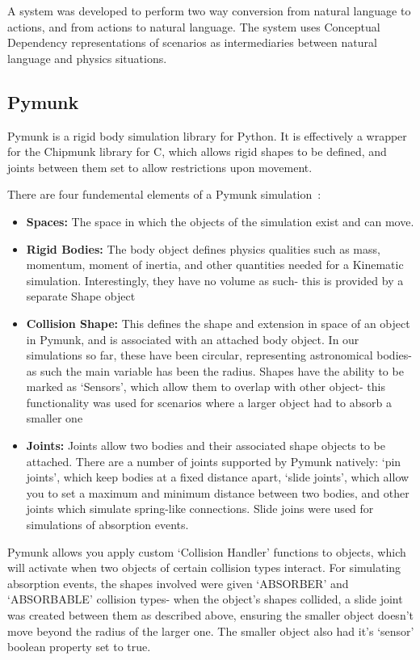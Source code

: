 \documentclass[dissertation.tex]{subfiles}
\begin{document}
    A system was developed to perform two way conversion from natural language to actions, and from actions to natural language. The system uses Conceptual Dependency representations of scenarios as intermediaries between natural language and physics situations.

    \subsection{Pymunk}
    Pymunk is a rigid body simulation library for Python. It is effectively a wrapper for the Chipmunk library for C, which allows rigid shapes to be defined, and joints between them set to allow restrictions upon movement.

    There are four fundemental elements of a Pymunk simulation~\cite{pymunk}:
    \begin{itemize}
        \item \textbf{Spaces:} The space in which the objects of the simulation exist and can move.
        \item \textbf{Rigid Bodies:} The body object defines physics qualities such as mass, momentum, moment of inertia, and other quantities needed for a Kinematic simulation. Interestingly, they have no volume as such- this is provided by a separate Shape object
        \item \textbf{Collision Shape:} This defines the shape and extension in space of an object in Pymunk, and is associated with an attached body object. In our simulations so far, these have been circular, representing astronomical bodies- as such the main variable has been the radius. Shapes have the ability to be marked as `Sensors', which allow them to overlap with other object- this functionality was used for scenarios where a larger object had to absorb a smaller one
        \item \textbf{Joints:} Joints allow two bodies and their associated shape objects to be attached. There are a number of joints supported by Pymunk natively: `pin joints', which keep bodies at a fixed distance apart, `slide joints', which allow you to set a maximum and minimum distance between two bodies, and other joints which simulate spring-like connections. Slide joins were used for simulations of absorption events. 
    \end{itemize}

    Pymunk allows you apply custom `Collision Handler' functions to objects, which will activate when two objects of certain collision types interact. For simulating absorption events, the shapes involved were given `ABSORBER' and `ABSORBABLE' collision types- when the object's shapes collided, a slide joint was created between them as described above, ensuring the smaller object doesn't move beyond the radius of the larger one. The smaller object also had it's `sensor' boolean property set to true.
\end{document}
